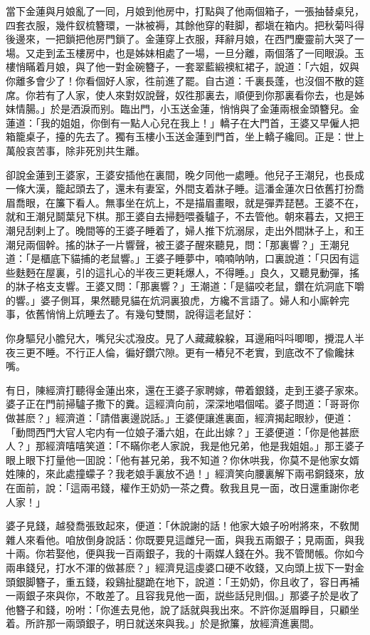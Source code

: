 當下金蓮與月娘亂了一囘，月娘到他房中，打點與了他兩個箱子，一張抽替桌兒，四套衣服，幾件釵梳簪環，一牀被褥，其餘他穿的鞋脚，都塡在箱内。把秋菊呌得後邊來，一把鎖把他房門鎖了。金蓮穿上衣服，拜辭月娘，在西門慶靈前大哭了一場。又走到孟玉樓房中，也是姊妹相處了一場，一旦分離，兩個落了一囘眼淚。玉樓悄瞞着月娘，與了他一對金碗簪子，一套翠藍緞襖紅裙子，說道：「六姐，奴與你離多會少了！你看個好人家，徃前進了罷。自古道：千裏長蓬，也沒個不散的筵席。你若有了人家，使人來對奴說聲，奴徃那裏去，順便到你那裏看你去，也是姊妹情腸。」於是洒淚而别。臨出門，小玉送金蓮，悄悄與了金蓮兩根金頭簪兒。金蓮道：「我的姐姐，你倒有一點人心兒在我上！」轎子在大門首，王婆又早僱人把箱籠桌子，擡的先去了。獨有玉樓小玉送金蓮到門首，坐上轎子纔囘。正是：世上萬般哀苦事，除非死別共生離。

卻說金蓮到王婆家，王婆安插他在裏間，晚夕同他一處睡。他兒子王潮兒，也長成一條大漢，籠起頭去了，還未有妻室，外間支着牀子睡。這潘金蓮次日依舊打扮喬眉喬眼，在簾下看人。無事坐在炕上，不是描眉畫眼，就是彈弄琵琶。王婆不在，就和王潮兒鬬葉兒下棋。那王婆自去掃麪喂養驢子，不去管他。朝來暮去，又把王潮兒刮剌上了。晚間等的王婆子睡着了，婦人推下炕溺尿，走出外間牀子上，和王潮兒兩個幹。搖的牀子一片響聲，被王婆子醒來聽見，問：「那裏響？」王潮兒道：「是櫃底下貓捕的老鼠響。」王婆子睡夢中，喃喃呐呐，口裏說道：「只因有這些麩麪在屋裏，引的這扎心的半夜三更耗爆人，不得睡。」良久，又聽見動彈，搖的牀子格支支響。王婆又問：「那裏響？」王潮道：「是貓咬老鼠，鑽在炕洞底下嚼的響。」婆子側耳，果然聽見貓在炕洞裏狼虎，方纔不言語了。婦人和小廝幹完事，依舊悄悄上炕睡去了。有幾句雙關，說得這老鼠好：

\begin{myquote}
你身驅兒小膽兒大，嘴兒尖忒潑皮。見了人藏藏躱躱，耳邊廂呌呌唧唧，攪混人半夜三更不睡。不行正人倫，徧好鑽穴隙。更有一樁兒不老實，到底改不了偸饞抹嘴。
\end{myquote}

有日，陳經濟打聽得金蓮出來，還在王婆子家聘嫁，帶着銀錢，走到王婆子家來。婆子正在門前掃驢子撒下的糞。這經濟向前，深深地唱個喏。婆子問道：「哥哥你做甚麽？」經濟道：「請借裏邊説話。」王婆便讓進裏面，經濟揭起眼紗，便道：「動問西門大官人宅内有一位娘子潘六姐，在此出嫁？」王婆便道：「你是他甚麽人？」那經濟嘻嘻笑道：「不瞞你老人家說，我是他兄弟，他是我姐姐。」那王婆子眼上眼下打量他一囬說：「他有甚兄弟，我不知道？你休哄我，你莫不是他家女婿姓陳的，來此處撞蠓子？我老娘手裏放不過！」經濟笑向腰裏解下兩弔銅錢來，放在面前，說：「這兩弔錢，權作王奶奶一茶之費。敎我且見一面，改日還重謝你老人家！」

婆子見錢，越發喬張致起來，便道：「休說謝的話！他家大娘子吩咐將來，不敎閒雜人來看他。咱放倒身說話：你既要見這雌兒一面，與我五兩銀子；見兩面，與我十兩。你若娶他，便與我一百兩銀子，我的十兩媒人錢在外。我不管閒帳。你如今兩串錢兒，打水不渾的做甚麽？」經濟見這虔婆口硬不收錢，又向頭上拔下一對金頭銀脚簪子，重五錢，殺鷄扯腿跪在地下，說道：「王奶奶，你且收了，容日再補一兩銀子來與你，不敢差了。且容我見他一面，説些話兒則個。」那婆子於是收了他簪子和錢，吩咐：「你進去見他，說了話就與我出來。不許你涎眉睜目，只顧坐着。所許那一兩頭銀子，明日就送來與我。」於是掀簾，放經濟進裏間。

